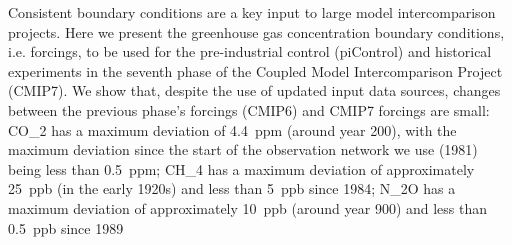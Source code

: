 Consistent boundary conditions are a key input to large model intercomparison projects.
Here we present the greenhouse gas concentration boundary conditions, i.e. forcings,
to be used for the pre-industrial control (piControl) and historical experiments
in the seventh phase of the Coupled Model Intercomparison Project (CMIP7).
We show that, despite the use of updated input data sources, changes between the previous phase's forcings (CMIP6) and CMIP7 forcings are small:
CO_2 has a maximum deviation of 4.4~ppm (around year 200),
with the maximum deviation since the start of the observation network we use (1981) being less than 0.5~ppm;
CH_4 has a maximum deviation of approximately 25~ppb (in the early 1920s) and less than 5~ppb since 1984;
N_2O has a maximum deviation of approximately 10~ppb (around year 900) and less than 0.5~ppb since 1989
